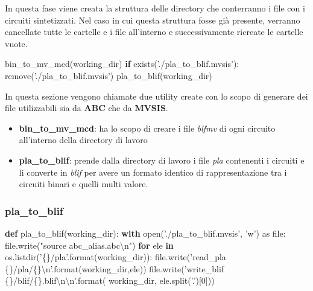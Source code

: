 \documentclass[italian,]{book}
\newenvironment{Shaded}{\begin{snugshade}}{\end{snugshade}}
\newcommand{\BuiltInTok}[1]{#1}
\newcommand{\CharTok}[1]{\textcolor[rgb]{0.31,0.60,0.02}{#1}}
\newcommand{\ControlFlowTok}[1]{\textcolor[rgb]{0.13,0.29,0.53}{\textbf{#1}}}
\newcommand{\DecValTok}[1]{\textcolor[rgb]{0.00,0.00,0.81}{#1}}
\newcommand{\ImportTok}[1]{#1}
\newcommand{\KeywordTok}[1]{\textcolor[rgb]{0.13,0.29,0.53}{\textbf{#1}}}
\newcommand{\NormalTok}[1]{#1}
\newcommand{\SpecialCharTok}[1]{\textcolor[rgb]{0.00,0.00,0.00}{#1}}
\newcommand{\StringTok}[1]{\textcolor[rgb]{0.31,0.60,0.02}{#1}}
\providecommand{\tightlist}{%
  \setlength{\itemsep}{0pt}\setlength{\parskip}{0pt}}
\begin{document}
In questa fase viene creata la struttura delle directory che conterranno i file con i circuiti sintetizzati. Nel caso in cui questa struttura fosse già presente, verranno cancellate tutte le cartelle e i file all'interno e successivamente ricreate le cartelle vuote.

\begin{Shaded}
\begin{Highlighting}[]
\NormalTok{bin_to_mv_mcd(working_dir)}
\ControlFlowTok{if}\NormalTok{ exists(}\StringTok{'./pla_to_blif.mvsis'}\NormalTok{):}
\NormalTok{  remove(}\StringTok{'./pla_to_blif.mvsis'}\NormalTok{)}
\NormalTok{pla_to_blif(working_dir)}
\end{Highlighting}
\end{Shaded}

\newpage

In questa sezione vengono chiamate due utility create con lo scopo di generare dei file utilizzabili sia da \textbf{ABC} che da \textbf{MVSIS}.

\begin{itemize}
\tightlist
\item
  \textbf{bin\_to\_mv\_mcd}: ha lo scopo di creare i file \emph{blfmv} di ogni circuito all'interno della directory di lavoro
\item
  \textbf{pla\_to\_blif}: prende dalla directory di lavoro i file \emph{pla} contenenti i circuiti e li converte in \emph{blif} per avere un formato identico di rappresentazione tra i circuiti binari e quelli multi valore.
\end{itemize}

\newpage

\hypertarget{pla_to_blif}{%
\subsubsection{pla\_to\_blif}\label{pla_to_blif}}

\begin{Shaded}
\begin{Highlighting}[]
\KeywordTok{def}\NormalTok{ pla_to_blif(working_dir):}
  \ControlFlowTok{with} \BuiltInTok{open}\NormalTok{(}\StringTok{'./pla_to_blif.mvsis'}\NormalTok{, }\StringTok{'w'}\NormalTok{) }\ImportTok{as} \BuiltInTok{file}\NormalTok{:}
    \BuiltInTok{file}\NormalTok{.write(}\StringTok{"source abc_alias.abc}\CharTok{\textbackslash{}n}\StringTok{"}\NormalTok{)}
    \ControlFlowTok{for}\NormalTok{ ele }\KeywordTok{in}\NormalTok{ os.listdir(}\StringTok{'}\SpecialCharTok{\{\}}\StringTok{/pla'}\NormalTok{.}\BuiltInTok{format}\NormalTok{(working_dir)):}
      \BuiltInTok{file}\NormalTok{.write(}\StringTok{'read_pla }\SpecialCharTok{\{\}}\StringTok{/pla/}\SpecialCharTok{\{\}}\CharTok{\textbackslash{}n}\StringTok{'}\NormalTok{.}\BuiltInTok{format}\NormalTok{(working_dir,ele))}
      \BuiltInTok{file}\NormalTok{.write(}\StringTok{'write_blif }\SpecialCharTok{\{\}}\StringTok{/blif/}\SpecialCharTok{\{\}}\StringTok{.blif}\CharTok{\textbackslash{}n\textbackslash{}n}\StringTok{'}\NormalTok{.}\BuiltInTok{format}\NormalTok{(}
\NormalTok{        working_dir, ele.split(}\StringTok{'.'}\NormalTok{)[}\DecValTok{0}\NormalTok{]))}
\end{Highlighting}
\end{Shaded}
\end{document}
